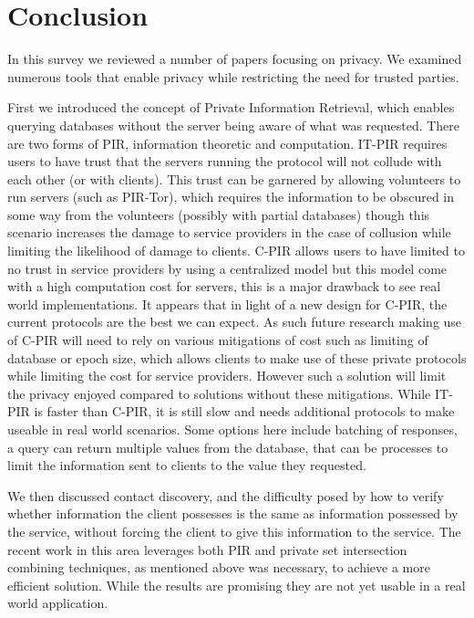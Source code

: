 \section{Conclusion}\label{sec:conclusion}
In this survey we reviewed a number of papers focusing on privacy. We examined
numerous tools that enable privacy while restricting the need for trusted
parties. 

First we introduced the concept of Private Information Retrieval, which enables
querying databases without the server being aware of what was requested. There
are two forms of PIR, information theoretic and computation. IT-PIR requires
users to have trust that the servers running the protocol will not collude with
each other (or with clients). This trust can be garnered by allowing volunteers
to run servers (such as PIR-Tor), which requires the information to be obscured
in some way from the volunteers (possibly with partial databases) though this
scenario increases the damage to service providers in the case of collusion
while limiting the likelihood of damage to clients. C-PIR allows users to have
limited to no trust in service providers by using a centralized model but this
model come with a high computation cost for servers, this is a major drawback to
see real world implementations. It appears that in light of a new design for
C-PIR, the current protocols are the best we can expect. As such future research
making use of C-PIR will need to rely on various mitigations of cost such as
limiting of database or epoch size, which allows clients to make use of these
private protocols while limiting the cost for service providers. However such a
solution will limit the privacy enjoyed compared to solutions without these
mitigations. While IT-PIR is faster than C-PIR, it is still slow and needs
additional protocols to make useable in real world scenarios. Some options here
include batching of responses, a query can return multiple values from the
database, that can be processes to limit the information sent to clients to the
value they requested.

We then discussed contact discovery, and the difficulty posed by how to verify
whether information the client possesses is the same as information possessed by
the service, without forcing the client to give this information to the service.
The recent work in this area leverages both PIR and private set intersection
combining techniques, as mentioned above was necessary, to achieve a more
efficient solution. While the results are promising they are not yet usable in a
real world application.

